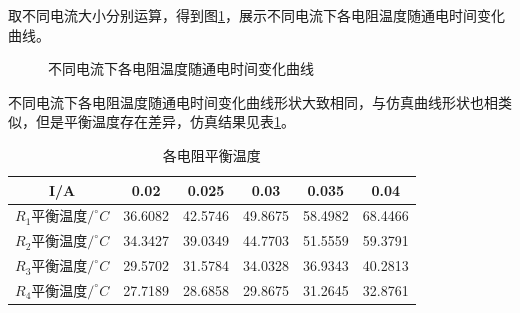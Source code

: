\documentclass[10pt,a4paper,twoside,UTF8]{ctexart}
\begin{document}
取不同电流大小分别运算，得到图\ref{fig: all copper}，展示不同电流下各电阻温度随通电时间变化曲线。
\begin{figure}[H]
	\centering

	\caption{不同电流下各电阻温度随通电时间变化曲线}
	\label{fig: all copper}
\end{figure}

不同电流下各电阻温度随通电时间变化曲线形状大致相同，与仿真曲线形状也相类似，但是平衡温度存在差异，仿真结果见表\ref{tab: 4}。
\begin{table}[H]
	\centering
	  \begin{tabular}{cccccc}
	  \toprule
	  I/A& 0.02 & 0.025 & 0.03 & 0.035 &0.04 \\
	  \midrule
	  $R_1$平衡温度$/^{\circ}C$&36.6082 & 42.5746 & 49.8675 & 58.4982 & 68.4466 \\
	  $R_2$平衡温度$/^{\circ}C$&34.3427 & 39.0349 & 44.7703 & 51.5559 & 59.3791 \\
	  $R_3$平衡温度$/^{\circ}C$&29.5702 & 31.5784 & 34.0328 & 36.9343 & 40.2813 \\
	  $R_4$平衡温度$/^{\circ}C$&27.7189 & 28.6858 & 29.8675 & 31.2645 & 32.8761 \\
	  \bottomrule
	\end{tabular}
	\caption{各电阻平衡温度}	  
	\label{tab: 4}
  \end{table}
\end{document}
